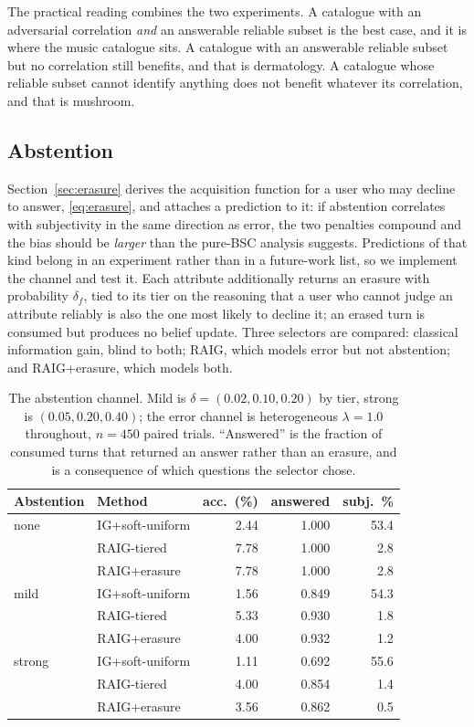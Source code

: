 The practical reading combines the two experiments. A catalogue with an
adversarial correlation \emph{and} an answerable reliable subset is the best
case, and it is where the music catalogue sits. A catalogue with an answerable
reliable subset but no correlation still benefits, and that is dermatology. A
catalogue whose reliable subset cannot identify anything does not benefit
whatever its correlation, and that is mushroom.

\subsection{Abstention}
\label{sec:results-erasure}

Section~\ref{sec:erasure} derives the acquisition function for a user who may
decline to answer, \eqref{eq:erasure}, and attaches a prediction to it: if
abstention correlates with subjectivity in the same direction as error, the two
penalties compound and the bias should be \emph{larger} than the pure-BSC
analysis suggests. Predictions of that kind belong in an experiment rather than
in a future-work list, so we implement the channel and test it. Each attribute
additionally returns an erasure with probability $\delta_f$, tied to its tier
on the reasoning that a user who cannot judge an attribute reliably is also the
one most likely to decline it; an erased turn is consumed but produces no
belief update. Three selectors are compared: classical information gain, blind
to both; RAIG, which models error but not abstention; and RAIG+erasure, which
models both.

\begin{table}[t]
\caption{The abstention channel. Mild is $\delta = (0.02, 0.10, 0.20)$ by tier,
strong is $(0.05, 0.20, 0.40)$; the error channel is heterogeneous
$\lambda = 1.0$ throughout, $n = 450$ paired trials. ``Answered'' is the
fraction of consumed turns that returned an answer rather than an erasure, and
is a consequence of which questions the selector chose.}
\label{tab:erasure}
\centering
\footnotesize
\begin{tabular}{@{}llrrr@{}}
\toprule
\textbf{Abstention} & \textbf{Method} & \textbf{acc.\ (\%)} &
\textbf{answered} & \textbf{subj.\ \%} \\
\midrule
none   & IG+soft-uniform & 2.44 & 1.000 & 53.4 \\
       & RAIG-tiered     & 7.78 & 1.000 & 2.8 \\
       & RAIG+erasure    & 7.78 & 1.000 & 2.8 \\
\midrule
mild   & IG+soft-uniform & 1.56 & 0.849 & 54.3 \\
       & RAIG-tiered     & 5.33 & 0.930 & 1.8 \\
       & RAIG+erasure    & 4.00 & 0.932 & 1.2 \\
\midrule
strong & IG+soft-uniform & 1.11 & 0.692 & 55.6 \\
       & RAIG-tiered     & 4.00 & 0.854 & 1.4 \\
       & RAIG+erasure    & 3.56 & 0.862 & 0.5 \\
\bottomrule
\end{tabular}
\end{table}

